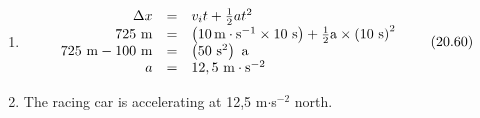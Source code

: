 {\begin{mdframed}[linewidth=4, leftmargin=40, rightmargin=40]
\begin{exercise}
\begin{enumerate}[noitemsep, label=\textbf{Step} \textbf{\arabic*}. ]
    \begin{equation}
    \Delta x={v}_{i}t+\frac{1}{2}a{t}^{2}\tag{20.59}
      \end{equation}
          \item  
          \label{m38796*id77845}\nopagebreak\noindent{}
            
    \begin{equation}
    \begin{array}{ccc}\hfill \Delta x& =& {v}_{i}t+\frac{1}{2}a{t}^{2}\hfill \\ \hfill 725\phantom{\rule{3.33333pt}{0ex}}\mathrm{m}& =& \left(10\phantom{\rule{0.166667em}{0ex}}\mathrm{m}\ensuremath{\cdot}{\mathrm{s}}^{-1}\ensuremath{\times}10\phantom{\rule{3.33333pt}{0ex}}\mathrm{s}\right)+\frac{1}{2}\mathrm{a}\ensuremath{\times}{\left(10\phantom{\rule{3.33333pt}{0ex}}\mathrm{s}\right)}^{2}\hfill \\ \hfill 725\phantom{\rule{3.33333pt}{0ex}}\mathrm{m}-100\phantom{\rule{3.33333pt}{0ex}}\mathrm{m}& =& \left(50{\phantom{\rule{3.33333pt}{0ex}}\mathrm{s}}^{2}\right)\phantom{\rule{3.33333pt}{0ex}}\mathrm{a}\hfill \\ \hfill a& =& 12,5\phantom{\rule{3.33333pt}{0ex}}\mathrm{m}\ensuremath{\cdot}{\mathrm{s}}^{-2}\hfill \end{array}\tag{20.60}
      \end{equation}
          \item  
          \label{m38796*id78121}The racing car is accelerating at 12,5 m$\ensuremath{\cdot}$s${}^{-2}$ north. \par 
          \end{enumerate}
    \end{exercise}
    \end{mdframed}
    }
    \noindent
\label{m38796*secfhsst!!!underscore!!!id5126}\vspace{.5cm} 
      \noindent
